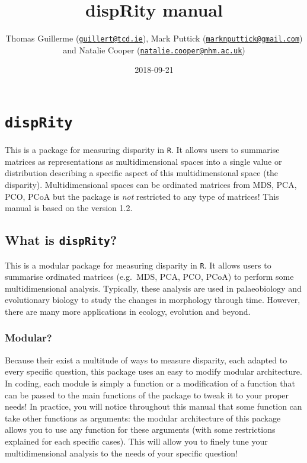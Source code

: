 \documentclass[]{book}
\title{dispRity manual}
\author{Thomas Guillerme
(\href{mailto:guillert@tcd.ie}{\nolinkurl{guillert@tcd.ie}}), Mark
Puttick
(\href{mailto:marknputtick@gmail.com}{\nolinkurl{marknputtick@gmail.com}})
and Natalie Cooper
(\href{mailto:natalie.cooper@nhm.ac.uk}{\nolinkurl{natalie.cooper@nhm.ac.uk}})}
\date{2018-09-21}
\theoremstyle{definition}
\theoremstyle{definition}
\theoremstyle{definition}
\theoremstyle{remark}
\begin{document}
\maketitle

{
\setcounter{tocdepth}{1}
\tableofcontents
}
\chapter{\texorpdfstring{\texttt{dispRity}}{dispRity}}\label{disprity}

This is a package for measuring disparity in \texttt{R}. It allows users
to summarise matrices as representations as multidimensional spaces into
a single value or distribution describing a specific aspect of this
multidimensional space (the disparity). Multidimensional spaces can be
ordinated matrices from MDS, PCA, PCO, PCoA but the package is
\emph{not} restricted to any type of matrices! This manual is based on
the version 1.2.

\section{\texorpdfstring{What is
\texttt{dispRity}?}{What is dispRity?}}\label{what-is-disprity}

This is a modular package for measuring disparity in \texttt{R}. It
allows users to summarise ordinated matrices (e.g.~MDS, PCA, PCO, PCoA)
to perform some multidimensional analysis. Typically, these analysis are
used in palaeobiology and evolutionary biology to study the changes in
morphology through time. However, there are many more applications in
ecology, evolution and beyond.

\subsection{Modular?}\label{modular}

Because their exist a multitude of ways to measure disparity, each
adapted to every specific question, this package uses an easy to modify
modular architecture. In coding, each module is simply a function or a
modification of a function that can be passed to the main functions of
the package to tweak it to your proper needs! In practice, you will
notice throughout this manual that some function can take other
functions as arguments: the modular architecture of this package allows
you to use any function for these arguments (with some restrictions
explained for each specific cases). This will allow you to finely tune
your multidimensional analysis to the needs of your specific question!
\end{document}
